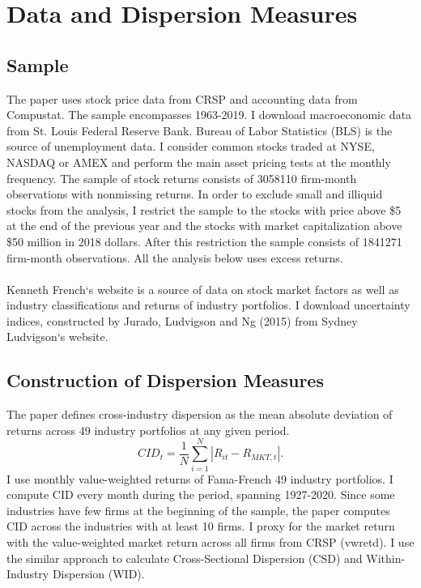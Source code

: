 \documentclass[12pt]{article}
\begin{document}


\section{Data and Dispersion Measures} \label{sec:Model}

\subsection{Sample}

The paper uses stock price data from CRSP and accounting data from Compustat. The sample encompasses 1963-2019. I download macroeconomic data from St. Louis Federal Reserve Bank. Bureau of Labor Statistics (BLS) is the source of unemployment data.
I consider common stocks traded at NYSE, NASDAQ or AMEX and perform the main asset pricing tests at the monthly frequency. The sample of stock returns consists of 3058110 firm-month observations with nonmissing returns. In order to exclude small and illiquid stocks from the analysis, I restrict the sample to the stocks with price above \$5 at the end of the previous year and the stocks with market capitalization above \$50 million in 2018 dollars. After this restriction the sample consists of 1841271 firm-month observations. All the analysis below uses excess returns.
\paragraph{}
Kenneth French`s website is a source of data on stock market factors as well as industry classifications and returns of industry portfolios. I download uncertainty indices, constructed by Jurado, Ludvigson and Ng (2015) from Sydney Ludvigson`s website. 

\subsection{Construction of Dispersion Measures}

The paper defines cross-industry dispersion as the mean absolute deviation of returns across 49 industry portfolios at any given period.
\begin{equation}
CID_t = \frac{1}{N}\sum^{N}_{i=1}{|R_{it}-R_{MKT,t}|}.
\end{equation}
I use monthly value-weighted returns of Fama-French 49 industry portfolios. I compute CID every month during the period, spanning 1927-2020. Since some industries have few firms at the beginning of the sample, the paper computes CID across the industries with at least 10 firms. I proxy for the market return with the value-weighted market return across all firms from CRSP (vwretd). I use the similar approach to calculate Cross-Sectional Dispersion (CSD) and Within-Industry Dispersion (WID).
\end{document}
